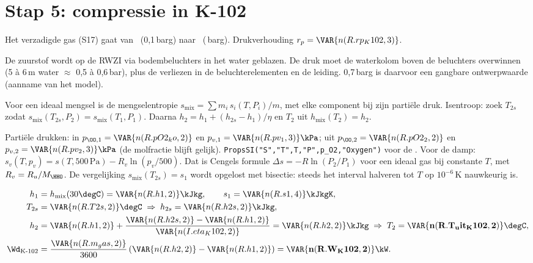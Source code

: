 \section{Stap 5: compressie in K-102}
Het verzadigde gas (S17) gaat van \kPa\ (0,1\,barg) naar \kPa\
(\,barg). Drukverhouding $r_p = \VAR{n(R.rp_K102,3)}$.
\begin{waarom}
De zuurstof wordt op de RWZI via bodembeluchters in het water geblazen. De druk moet de waterkolom boven de
beluchters overwinnen (5 à 6\,m water $\approx$ 0,5 à 0,6\,bar), plus de verliezen in de beluchterelementen en de
leiding. 0,7\,barg is daarvoor een gangbare ontwerpwaarde (aanname van het model).
\end{waarom}
\begin{methode}[– Cengel H7 + H13]
Voor een ideaal mengsel is de mengselentropie $s_\mathrm{mix} = \sum m_i\,s_i(T,P_i)/m$, met elke component bij
zijn partiële druk. Isentroop: zoek $T_{2s}$ zodat $s_\mathrm{mix}(T_{2s},P_2) = s_\mathrm{mix}(T_1,P_1)$. Daarna
$h_2 = h_1 + (h_{2s}-h_1)/\eta$ en $T_2$ uit $h_\mathrm{mix}(T_2) = h_2$.
\end{methode}
\begin{coolprop}
Partiële drukken: in $p_{\OO,1} = \VAR{n(R.pO2_ko,2)}$ en $p_{v,1} = \VAR{n(R.pv_1,3)}\kPa$; uit
$p_{\OO,2} = \VAR{n(R.pO2_2,2)}$ en $p_{v,2} = \VAR{n(R.pv_2,3)}\kPa$ (de molfractie blijft gelijk).
\texttt{PropsSI("S","T",T,"P",p\_O2,"Oxygen")} voor de \OO.
Voor de damp: $s_v(T,p_v) = s(T,500\,\mathrm{Pa}) - R_v\ln(p_v/500)$. Dat is Cengels formule
$\Delta s = -R\ln(P_2/P_1)$ voor een ideaal gas bij constante $T$, met $R_v = R_u/M_{\HHO}$.
De vergelijking $s_\mathrm{mix}(T_{2s}) = s_1$ wordt opgelost met bisectie: steeds het interval halveren
tot $T$ op $10^{-6}$\,K nauwkeurig is.
\end{coolprop}
\begin{align*}
h_1 &= h_\mathrm{mix}(30\degC) = \VAR{n(R.h1,2)}\kJkg, \qquad s_1 = \VAR{n(R.s1,4)}\kJkgK,\\
T_{2s} &= \VAR{n(R.T2s,2)}\degC \;\Rightarrow\; h_{2s} = \VAR{n(R.h2s,2)}\kJkg,\\
h_2 &= \VAR{n(R.h1,2)} + \frac{\VAR{n(R.h2s,2)} - \VAR{n(R.h1,2)}}{\VAR{n(I.eta_K102,2)}} = \VAR{n(R.h2,2)}\kJkg \;\Rightarrow\; T_2 = \mathbf{\VAR{n(R.T_uit_K102,2)}\degC},\\
\Wd_{\text{K-102}} &= \frac{\VAR{n(R.m_gas,2)}}{3600}\,(\VAR{n(R.h2,2)} - \VAR{n(R.h1,2)}) = \mathbf{\VAR{n(R.W_K102,2)}\kW}.
\end{align*}
